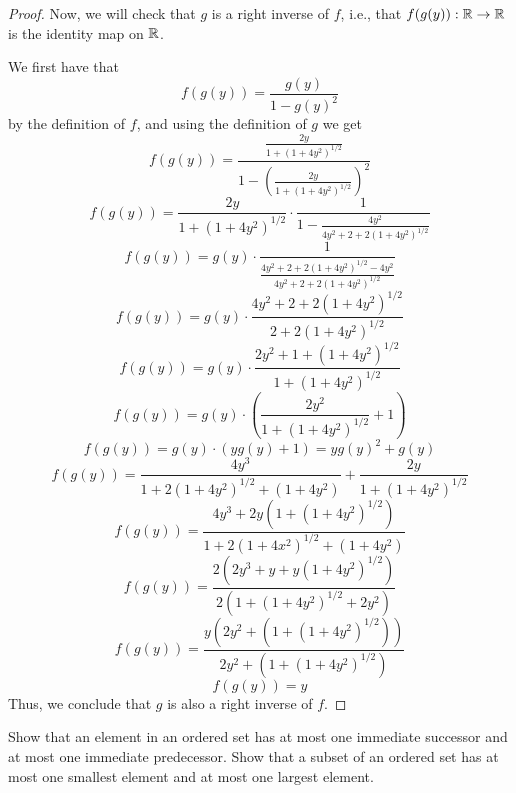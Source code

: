 \documentclass[12pt]{article}
\begin{document}
\begin{enumerate}[label=(\alph*)]
\begin{proof}
		Now, we will check that $g$ is a right inverse of $f$, i.e., that $f(g(y)): \mathbb{R} \to \mathbb{R}$ is the identity
		map on $\mathbb{R}$.
		
		We first have that 
		$$
		f(g(y)) = \frac{g(y)}{1 - g(y)^2}
		$$
		by the definition of $f$, and using the definition of $g$ we get
		$$
		f(g(y)) = \frac{\frac{2y} {1 + (1 + 4y^2)^{1/2}}}{1 - \left(\frac{2y}{1 + (1 + 4y^2)^{1/2}}\right)^2}
		$$
		$$
		f(g(y)) = \frac{2y}{1 + (1 + 4y^2)^{1/2}} \cdot \frac{1}{1 - \frac{4y^2}{4y^2 + 2 + 
		2(1 + 4y^2)^{1/2}}}
		$$
		$$
		f(g(y)) = g(y) \cdot 
		\frac{1} {\frac{4y^2 + 2 + 2(1 + 4y^2)^{1/2} - 4y^2} {4y^2 + 2 + 2(1 + 4y^2)^{1/2}}}
		$$
		$$
		f(g(y)) = g(y) \cdot 
		\frac{4y^2 + 2 + 2(1 + 4y^2)^{1/2}}{2 + 2(1 + 4y^2)^{1/2}}
		$$
		$$
		f(g(y)) = g(y) \cdot 
		\frac{2y^2 + 1 + (1 + 4y^2)^{1/2}}{1 + (1 + 4y^2)^{1/2}}
		$$
		$$
		f(g(y)) = g(y) \cdot \left(\frac{2y^2}{1 + (1 + 4y^2)^{1/2}} + 1 \right)
		$$
		$$
		f(g(y)) = g(y) \cdot \left(yg(y) + 1\right) = yg(y)^2 + g(y)
		$$
		$$
		f(g(y)) = \frac{4y^3}{1 + 2(1 + 4y^2)^{1/2} + (1 + 4y^2)} + \frac{2y}{1 + (1 + 4y^2)^{1/2}}
		$$
		$$
		f(g(y)) = \frac{4y^3 + 2y(1 + (1 + 4y^2)^{1/2})}{1 + 2(1 + 4x^2)^{1/2} + (1 + 4y^2)}
		$$
		$$
		f(g(y)) = \frac{2\left(2y^3 + y + y(1 + 4y^2)^{1/2}\right)}{2 \left(1 + (1 + 4y^2)^{1/2} + 2y^2\right)}
		$$
		$$
		f(g(y)) = \frac{y\left(2y^2 + (1 + (1 + 4y^2)^{1/2})\right)}{2y^2 + (1 + (1 + 4y^2)^{1/2})}
		$$
		$$
		f(g(y)) = y
		$$
		Thus, we conclude that $g$ is also a right inverse of $f$.
	\end{proof}
\end{enumerate}

 Show that an element in an ordered set has at most one immediate successor 
and at most one immediate predecessor. Show that a subset of an ordered set has at most
one smallest element and at most one largest element.
\end{document}

